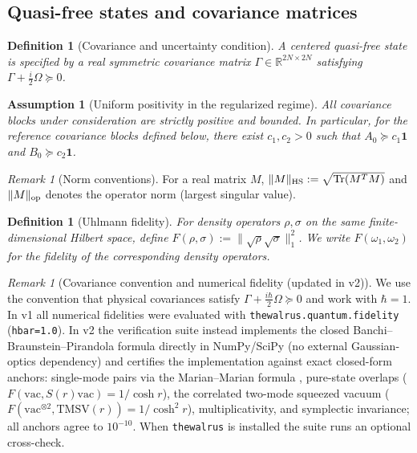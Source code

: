 \documentclass[11pt]{article}
\newtheorem{definition}[theorem]{Definition}
\newtheorem{assumption}[theorem]{Assumption}
\theoremstyle{remark}
\newtheorem{remark}[theorem]{Remark}
\newcommand{\HS}{{\rm HS}}
\newcommand{\op}{{\rm op}}
\newcommand{\Tr}{\operatorname{Tr}}
\begin{document}
\subsection{Quasi-free states and covariance matrices}
\begin{definition}[Covariance and uncertainty condition]
A centered quasi-free state is specified by a real symmetric covariance
matrix $\Gamma \in \mathbb{R}^{2N\times 2N}$ satisfying
$\Gamma + \frac{i}{2}\Omega \succeq 0$.
\end{definition}

\begin{assumption}[Uniform positivity in the regularized regime]
\label{ass:pos}
All covariance blocks under consideration are strictly positive and bounded.
In particular, for the reference covariance blocks defined below, there
exist $c_1, c_2 > 0$ such that $A_0 \succeq c_1 \mathbf{1}$ and
$B_0 \succeq c_2 \mathbf{1}$.
\end{assumption}

\begin{remark}[Norm conventions]
For a real matrix $M$, $\|M\|_\HS := \sqrt{\Tr(M^T M)}$ and $\|M\|_\op$
denotes the operator norm (largest singular value).
\end{remark}

\begin{definition}[Uhlmann fidelity]
For density operators $\rho, \sigma$ on the same finite-dimensional Hilbert
space, define $F(\rho,\sigma) := \|\sqrt{\rho}\sqrt{\sigma}\|_1^2$. We write
$F(\omega_1,\omega_2)$ for the fidelity of the corresponding density
operators.
\end{definition}

\begin{remark}[Covariance convention and numerical fidelity (updated in v2)]
\label{rem:numconv}
We use the convention that physical covariances satisfy
$\Gamma + \frac{i\hbar}{2}\Omega \succeq 0$ and work with $\hbar = 1$. In v1
all numerical fidelities were evaluated with
\texttt{thewalrus.quantum.fidelity} (\texttt{hbar=1.0}). In v2 the
verification suite instead implements the closed
Banchi--Braunstein--Pirandola formula \cite{BBP} directly in NumPy/SciPy
(no external Gaussian-optics dependency) and certifies the implementation
against exact closed-form anchors: single-mode pairs via the
Marian--Marian formula \cite{Marian}, pure-state overlaps
($F(\mathrm{vac}, S(r)\mathrm{vac}) = 1/\cosh r$), the correlated two-mode
squeezed vacuum ($F(\mathrm{vac}^{\otimes 2}, \mathrm{TMSV}(r)) =
1/\cosh^2 r$), multiplicativity, and symplectic invariance; all anchors
agree to $10^{-10}$. When \texttt{thewalrus} is installed the suite runs an
optional cross-check.
\end{remark}
\end{document}
